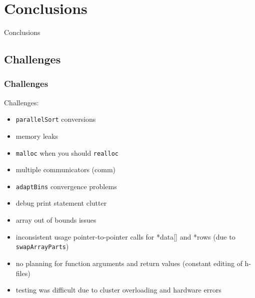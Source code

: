 \documentclass[usernames,dvipsnames]{beamer}
\begin{document}
\section{Conclusions}

\begin{frame}	
	\begin{Huge}
		\begin{center}
			Conclusions
		\end{center}
	\end{Huge}
\end{frame}

\subsection{Challenges}

\begin{frame}	
	\frametitle{Challenges}
	
	\begin{alertblock}{Challenges:}
		\begin{itemize}
			\item \texttt{parallelSort} conversions
			\item memory leaks
			\item \texttt{malloc} when you should \texttt{realloc}
			\item multiple communicators (comm)
			\item \texttt{adaptBins} convergence problems
			\item debug print statement clutter
			\item array out of bounds issues
			\item inconsistent usage pointer-to-pointer calls for *data[] and *rows (due to \texttt{swapArrayParts})
			\item no planning for function arguments and return values (constant editing of h-files)
			\item testing was difficult due to cluster overloading and hardware errors
		\end{itemize}
	\end{alertblock}

\end{frame}
\end{document}
